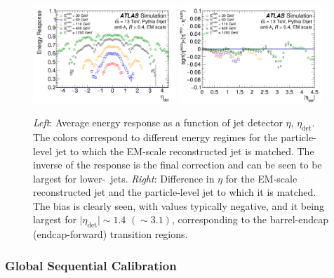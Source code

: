 \begin{figure}[!htb]
    \begin{center}
        \includegraphics[width=0.48\textwidth]{figures/chapter3/jets/abs_jes_response}
        \includegraphics[width=0.48\textwidth]{figures/chapter3/jets/abs_jes_eta}
        \caption{
            \textit{Left}: Average energy response as a function of jet detector $\eta$, $\eta_{\text{det}}$.
            The colors correspond to different energy regimes for the particle-level jet to which the EM-scale
            reconstructed jet is matched. The inverse of the response is the final correction and can be seen to be
            largest for lower-\pT~jets.
            \textit{Right}: Difference in $\eta$ for the EM-scale reconstructed jet and the particle-level jet to which
            it is matched. The bias is clearly seen, with values typically negative, and it being largest
            for $\lvert \eta_{\text{det}} \rvert \sim 1.4$ $(\sim 3.1)$, corresponding to the barrel-endcap (endcap-forward)
            transition regions.
        }
        \label{fig:abs_jes_response}
    \end{center}
\end{figure}
\FloatBarrier

\subsubsection{Global Sequential Calibration}
\label{sec:jet_gsc}

